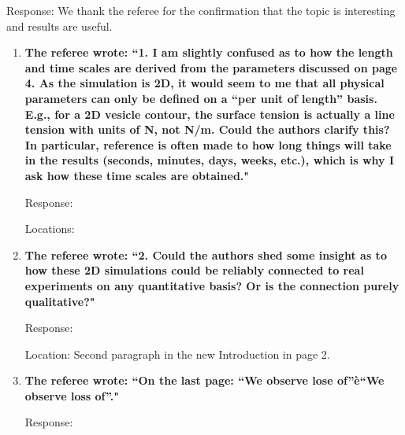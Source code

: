 \documentclass[12pt]{article}
\begin{document}
\noindent
Response: We thank the referee for the confirmation that the topic is interesting and results are useful.

\begin{enumerate}

\item {\bf The referee wrote: ``1. I am slightly confused as to how the length and time scales are derived from the parameters discussed on page 4. As the simulation is 2D, it would seem to me that all physical parameters can only be defined on a “per unit of length” basis. E.g., for a 2D vesicle contour, the surface tension is actually a line tension with units of N, not N/m. Could the authors clarify this?
In particular, reference is often made to how long things will take in the results (seconds,
minutes, days, weeks, etc.), which is why I ask how these time scales are obtained."}

\noindent
Response: 

\noindent
Locations: 


\item {\bf The referee wrote: ``2. Could the authors shed some insight as to how these 2D simulations could be reliably connected to real experiments on any quantitative basis? Or is the connection purely
qualitative?"}

\noindent
Response: 

\noindent
Location: Second paragraph in the new Introduction in page 2.

\item {\bf The referee wrote: ``On the last page: “We observe lose of”è“We observe loss of”."}

\noindent
Response: \end{enumerate}
\end{document}
